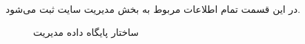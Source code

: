 در این قسمت تمام اطلاعات مربوط به بخش مدیریت سایت ثبت می‌شود.

\begin{figure}[H]
	\centering
	\caption{ساختار پایگاه داده مدیریت}
	\label{fig:db:مدیریت}
\end{figure}